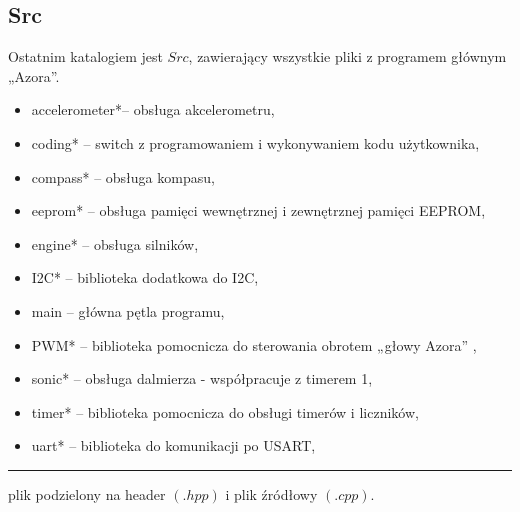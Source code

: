     \subsection{Src}
        \tab Ostatnim katalogiem jest $Src$, zawierający wszystkie pliki z programem głównym „Azora”. 
        \begin{itemize}
            \item accelerometer*-- obsługa akcelerometru,
            \item coding*       -- switch z programowaniem i wykonywaniem kodu użytkownika,
            \item compass*      -- obsługa kompasu,
            \item eeprom*       -- obsługa pamięci wewnętrznej i zewnętrznej pamięci EEPROM,
            \item engine*       -- obsługa silników,
            \item I2C*          -- biblioteka dodatkowa do I2C,
            \item main          -- główna pętla programu,
            \item PWM*          -- biblioteka pomocnicza do sterowania obrotem „głowy Azora” ,
            \item sonic*        -- obsługa dalmierza - współpracuje z timerem 1,
            \item timer*        -- biblioteka pomocnicza do obsługi timerów i liczników,
            \item uart*         -- biblioteka do komunikacji po USART,
        \end{itemize}
        \vspace{4pt}
        \hrule
        \vspace{16pt}
        \tab * plik podzielony na header $(.hpp)$ i plik źródłowy $(.cpp)$.

    

        